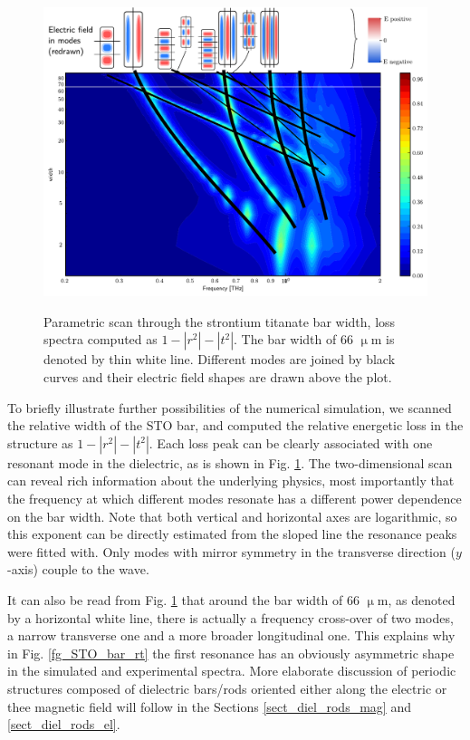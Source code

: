 \begin{figure}[h] \centering \caption{Parametric scan through the strontium titanate bar width, loss spectra computed as $1-|r^2|-|t^2|$. The bar width of 66 $\upmu$m is denoted by thin white line. Different modes are joined by black curves and their electric field shapes are drawn above the plot.} \includegraphics[width=\textwidth]{img/STOBarC_modes2.pdf} \label{fg_STO_bar_modes} \end{figure}
To briefly illustrate further possibilities of the numerical simulation, we scanned the relative width of the STO bar, and computed the relative energetic loss in the structure as $1-|r^2|-|t^2|$. Each loss peak can be clearly associated with one resonant mode in the dielectric, as is shown in Fig. \ref{fg_STO_bar_modes}. The two-dimensional scan can reveal rich information about the underlying physics, most importantly that the frequency at which different modes resonate has a different power dependence on the bar width. Note that both vertical and horizontal axes are logarithmic, so this exponent can be directly estimated from the sloped line the resonance peaks were fitted with. Only modes with mirror symmetry in the transverse direction ($y$-axis) couple to the wave.

It can also be read from Fig. \ref{fg_STO_bar_modes} that around the bar width of 66 $\upmu$m, as denoted by a horizontal white line, there is actually a frequency cross-over of two modes, a narrow transverse one and a more broader longitudinal one. This explains why in Fig. \ref{fg_STO_bar_rt} the first resonance has an obviously asymmetric shape in the simulated and experimental spectra.  %
More elaborate discussion of periodic structures composed of dielectric bars/rods oriented either along the electric or thee magnetic field will follow in the Sections \ref{sect_diel_rods_mag} and \ref{sect_diel_rods_el}.

